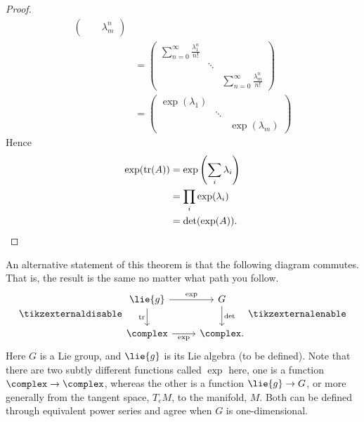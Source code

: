 \begin{lma}{}{}
\begin{proof}
\begin{align}
\begin{pmatrix}
                && \lambda_m^n
            \end{pmatrix}
            \\
            &= 
            \begin{pmatrix}
                \sum_{n = 0}^{\infty} \frac{\lambda_1^n}{n!} && \\
                & \ddots & \\
                && \sum_{n = 0}^{\infty} \frac{\lambda_m^n}{n!}
            \end{pmatrix}
            \\
            &= 
            \begin{pmatrix}
                \exp(\lambda_1) && \\
                & \ddots & \\
                && \exp(\lambda_m)
            \end{pmatrix}
        \end{align}
        \endgroup
        Hence
        \begin{align}
            \exp(\operatorname{tr}(A)) &= \exp\left( \sum_{i} \lambda_i \right)\\
            &= \prod_{i} \exp(\lambda_i)\\
            &= \det(\exp(A)).
        \end{align}
    \end{proof}
\end{lma}

An alternative statement of this theorem is that the following diagram commutes.
That is, the result is the same no matter what path you follow.
\begin{equation}
    \tikzexternaldisable
    \begin{tikzcd}
        \lie{g} \arrow[r, "\exp"] \arrow[d, "\tr"'] & G \arrow[d, "\det"] \\
        \complex \arrow[r, "\exp"'] & \complex.
    \end{tikzcd}
    \tikzexternalenable
\end{equation}
Here \(G\) is a Lie group, and \(\lie{g}\) is its Lie algebra (to be defined).
Note that there are two subtly different functions called \(\exp\) here, one is a function \(\complex \to \complex\), whereas the other is a function \(\lie{g} \to G\), or more generally from the tangent space, \(T_eM\), to the manifold, \(M\).
Both can be defined through equivalent power series and agree when \(G\) is one-dimensional.

